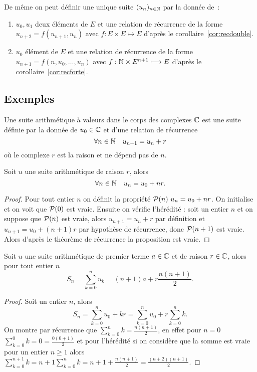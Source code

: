 De même on peut définir une unique suite $(u_n)_{n\in\N}$ par la donnée de~:
\begin{enumerate}
\item $u_0, u_1$ deux éléments de $E$ et une relation de récurrence de la forme $u_{n+2}=f(u_{n+1},u_{n})$ avec $f:E\times E\longmapsto E$ d'après le corollaire~\ref{cor:recdouble}.
\item $u_0$ élément de $E$ et une relation de récurrence de la forme $u_{n+1}=f(n,u_{0},\ldots,u_{n})$ avec $f:\N\times E^{n+1}\longmapsto E$ d'après le corollaire~\ref{cor:recforte}.
\end{enumerate}

\subsection{Exemples}
\begin{defdef}
  Une suite arithmétique à valeurs dans le corps des complexes $\C$ est une suite définie par la donnée de $u_0\in\C$ et d'une relation de récurrence 
  \begin{equation}
    \forall n \in \N \quad u_{n+1}=u_n+r
  \end{equation}
  où le complexe $r$ est la raison et ne dépend pas de $n$.
\end{defdef}
\begin{prop}
  Soit $u$ une suite arithmétique de raison $r$, alors
  \begin{equation}
    \forall n \in \N \quad u_n=u_0+nr.
  \end{equation}
\end{prop}
\begin{proof}
  Pour tout entier $n$ on définit la propriété $\P(n) \ u_n=u_0+nr$. On initialise et on voit que $\P(0)$ est vraie. Ensuite on vérifie l'hérédité : soit un entier $n$ et on suppose que $\P(n)$ est vraie, alors $u_{n+1}=u_n+r$ par définition et $u_{n+1}=u_0+(n+1)r$ par hypothèse de récurrence, donc $\P(n+1)$ est vraie. Alors d'après le théorème de récurrence la proposition est vraie.
\end{proof}
\begin{prop}
  Soit $u$ une suite arithmétique de premier terme $a\in\C$ et de raison $r\in\C$, alors pour tout entier $n$
  \begin{equation}
    S_n=\sum_{k=0}^n u_k=(n+1)a+r\frac{n(n+1)}{2}.
  \end{equation}
\end{prop}
\begin{proof}
  Soit un entier $n$, alors
  \begin{equation}
    S_n=\sum_{k=0}^n u_0+kr= \sum_{k=0}^n u_0 + r\sum_{k=0}^n k.
  \end{equation}
  On montre par récurrence que $\sum_{k=0}^n k=\frac{n(n+1)}{2}$, en effet pour $n=0$ $\sum_{k=0}^0 k=0=\frac{0(0+1)}{2}$ et pour l'hérédité si on considère que la somme est vraie pour un entier $n \geq 1$ alors $\sum_{k=0}^{n+1} k= n+1 \sum_{k=0}^n k=n+1+\frac{n(n+1)}{2}=\frac{(n+2)(n+1)}{2}$.
\end{proof}
